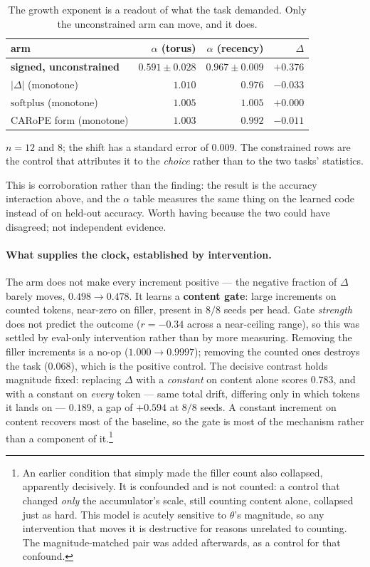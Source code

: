\documentclass[11pt]{article}
\begin{document}
\begin{table}[htbp]\centering\small
\caption{The growth exponent is a readout of what the task demanded. Only the unconstrained arm can move, and it does.}
\label{tab:alphashift}
\begin{tabular}{lrrr}
\toprule
arm & $\alpha$ (torus) & $\alpha$ (recency) & $\Delta$ \\
\midrule
\textbf{signed, unconstrained} & $\mathbf{0.591 \pm 0.028}$ & $\mathbf{0.967 \pm 0.009}$ & $\mathbf{+0.376}$ \\
$|\Delta|$ (monotone) & $1.010$ & $0.976$ & $-0.033$ \\
$\mathrm{softplus}$ (monotone) & $1.005$ & $1.005$ & $+0.000$ \\
CARoPE form (monotone) & $1.003$ & $0.992$ & $-0.011$ \\
\bottomrule
\end{tabular}
\end{table}

\noindent $n=12$ and $8$; the shift has a standard error of $0.009$. The
constrained rows are the control that attributes it to the \emph{choice} rather
than to the two tasks' statistics.

This is corroboration rather than the finding: the result is the accuracy
interaction above, and the $\alpha$ table measures the same thing on the learned
code instead of on held-out accuracy. Worth having because the two could have
disagreed; not independent evidence.

\paragraph{What supplies the clock, established by intervention.} The arm does not
make every increment positive --- the negative fraction of $\Delta$ barely moves,
$0.498 \to 0.478$. It learns a \textbf{content gate}: large increments on counted
tokens, near-zero on filler, present in $8/8$ seeds per head. Gate \emph{strength}
does not predict the outcome ($r=-0.34$ across a near-ceiling range), so this was
settled by eval-only intervention rather than by more measuring. Removing the
filler increments is a no-op ($1.000 \to 0.9997$); removing the counted ones
destroys the task ($0.068$), which is the positive control. The decisive contrast
holds magnitude fixed: replacing $\Delta$ with a \emph{constant} on content alone
scores $0.783$, and with a constant on \emph{every} token --- same total drift,
differing only in which tokens it lands on --- $0.189$, a gap of $+0.594$ at $8/8$
seeds. A constant increment on content recovers most of the baseline, so the gate
is most of the mechanism rather than a component of it.\footnote{An earlier
condition that simply made the filler count also collapsed, apparently decisively.
It is confounded and is not counted: a control that changed \emph{only} the
accumulator's scale, still counting content alone, collapsed just as hard. This
model is acutely sensitive to $\theta$'s magnitude, so any intervention that moves
it is destructive for reasons unrelated to counting. The magnitude-matched pair was
added afterwards, as a control for that confound.}
\end{document}
